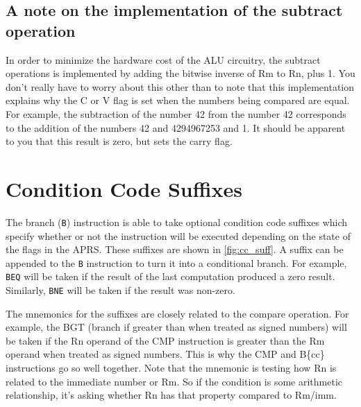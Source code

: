 \subsection{A note on the implementation of the subtract operation}
In order to minimize the hardware cost of the ALU circuitry, the subtract operations is implemented by adding the bitwise inverse of Rm to Rn, plus 1. You don't really have to worry about this other than to note that this implementation explains why the C or V flag is set when the numbers being compared are equal. For example, the subtraction of the number 42 from the number 42 corresponds to the addition of the numbers 42 and 4294967253 and 1. It should be apparent to you that this result is zero, but sets the carry flag. 


\section{Condition Code Suffixes} 
The branch (\texttt{B}) instruction is able to take optional condition code suffixes which specify whether or not the instruction will be executed depending on the state of the flags in the APRS. 
These suffixes are shown in \autoref{fig:cc_suff}. A suffix can be appended to the \texttt{B} instruction to turn it into a conditional branch. For example, \texttt{BEQ} will be taken if the result of the last computation produced a zero result. Similarly, \texttt{BNE} will be taken if the result was non-zero. 

The mnemonics for the suffixes are closely related to the compare operation. For example, the BGT (branch if greater than when treated as signed numbers) will be taken if the Rn operand of the CMP instruction is greater than the Rm operand when treated as signed numbers. This is why the CMP and B\{cc\}  instructions go so well together.
Note that the mnemonic is testing how Rn is related to the immediate number or Rm. So if the condition is some arithmetic relationship, it's asking whether Rn has that property compared to Rm/imm.

